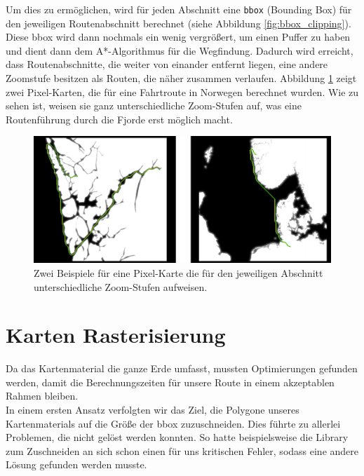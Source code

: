 \documentclass[letterpaper]{article}
\begin{document}
	Um dies zu ermöglichen, wird für jeden Abschnitt eine \texttt{bbox} (Bounding Box) für den jeweiligen Routenabschnitt berechnet (siehe Abbildung \ref{fig:bbox_clipping}). Diese bbox wird dann nochmals ein wenig vergrößert, um einen Puffer zu haben und dient dann dem A*-Algorithmus für die Wegfindung.
	Dadurch wird erreicht, dass Routenabschnitte, die weiter von einander entfernt liegen, eine andere Zoomstufe besitzen als Routen, die näher zusammen verlaufen. Abbildung \ref{fig:bbox_clipping_pixelmap} zeigt zwei Pixel-Karten, die für eine Fahrtroute in Norwegen berechnet wurden. Wie zu sehen ist, weisen sie ganz unterschiedliche Zoom-Stufen auf, was eine Routenführung durch die Fjorde erst möglich macht.

	\begin{figure}[!htbp]
		\centering
		\includegraphics[width=\linewidth]{bbox_clipping_pixelmap}
		\caption{Zwei Beispiele für eine Pixel-Karte die für den jeweiligen Abschnitt unterschiedliche Zoom-Stufen aufweisen.}
		\label{fig:bbox_clipping_pixelmap}
	\end{figure}

\section{Karten Rasterisierung}
	Da das Kartenmaterial die ganze Erde umfasst, mussten Optimierungen gefunden werden, damit die Berechnungszeiten für unsere Route in einem akzeptablen Rahmen bleiben.\\

	In einem ersten Ansatz verfolgten wir das Ziel, die Polygone unseres Kartenmaterials auf die Größe der bbox zuzuschneiden. Dies führte zu allerlei Problemen, die nicht gelöst werden konnten. So hatte beispielsweise die Library zum Zuschneiden an sich schon einen für uns kritischen Fehler\footnotemark, sodass eine andere Lösung gefunden werden musste.
\end{document}
